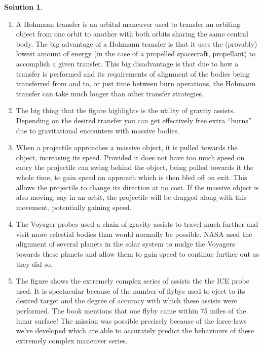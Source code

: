 \documentclass[10pt]{article}
\theoremstyle{definition}
\newtheorem{soln}{Solution}
\begin{document}
\begin{soln}
  \begin{enumerate}[label=(\alph*)]
    \item A Hohmann transfer is an orbital maneuver used to transfer an orbiting object from one orbit to another with both orbits sharing the same central body. The big advantage
          of a Hohmann transfer is that it uses the (provably) lowest amount of energy (in the case of a propelled spacecraft, propellant) to accomplish a given transfer. This big disadvantage is that
          due to how a transfer is performed and its requirements of alignment of the bodies being transferred from and to, or just time between burn operations, the Hohmann transfer can take much longer
          than other transfer strategies.
    \item The big thing that the figure highlights is the utility of gravity assists. Depending on the desired transfer you can get effectively free extra
          ``burns'' due to gravitational encounters with massive bodies.
    \item When a projectile approaches a massive object, it is pulled towards the object, increasing its speed. Provided it does not have too much speed on entry
          the projectile can swing behind the object, being pulled towards it the whole time, to gain speed on approach which is then bled off on exit. This allows the projectile
          to change its direction at no cost. If the massive object is also moving, say in an orbit, the projectile will be dragged along with this movement, potentially gaining speed.
    \item The Voyager probes used a chain of gravity assists to travel much further and visit more celestial bodies than would normally be possible. NASA used the alignment
          of several planets in the solar system to nudge the Voyagers towards these planets and allow them to gain speed to continue further out as they did so.
    \item The figure shows the extremely complex series of assists the the ICE probe used. It is spectacular because of the number of flybys used to eject to its desired target
          and the degree of accuracy with which these assists were performed. The book mentions that one flyby came within 75 miles of the lunar surface! The mission was possible
          precisely because of the force-laws we've developed which are able to accurately predict the behaviours of these extremely complex maneuver series.
  \end{enumerate}
\end{soln}
\end{document}

